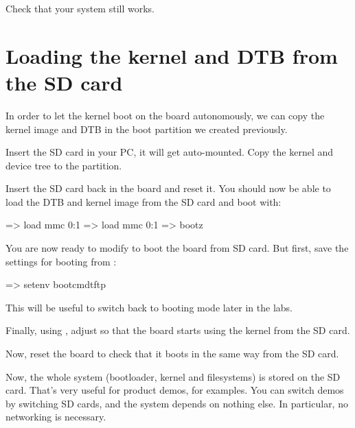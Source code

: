 Check that your system still works.

\section{Loading the kernel and DTB from the SD card}

In order to let the kernel boot on the board autonomously, we can
copy the kernel image and DTB in the boot partition we created
previously.

Insert the SD card in your PC, it will get auto-mounted. Copy the
kernel and device tree to the  partition.

Insert the SD card back in the board and reset it. You should now be
able to load the DTB and kernel image from the SD card and boot with:

\begin{ubootinput}
=> load mmc 0:1 %
=> load mmc 0:1 %
=> bootz %
\end{ubootinput}

You are now ready to modify  to boot the board
from SD card. But first, save the settings for booting from
:

\begin{ubootinput}
=> setenv bootcmdtftp %
\end{ubootinput}

This will be useful to switch back to  booting mode
later in the labs.

Finally, using , adjust  so that
the board starts using the kernel from the SD card.

Now, reset the board to check that it boots in the same way from the
SD card.

Now, the whole system (bootloader, kernel and filesystems) is
stored on the SD card. That's very useful for product demos, for
examples. You can switch demos by switching SD cards, and the
system depends on nothing else. In particular, no networking is
necessary.
